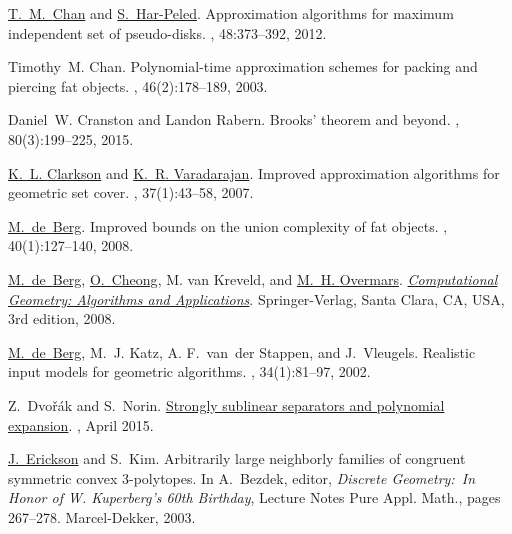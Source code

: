 \documentclass[12pt]{article}
\theoremstyle{remark}\theoremheaderfont{\sf}\theorembodyfont{\upshape}
\numberwithin{figure}{section}\numberwithin{table}{section}\numberwithin{equation}{section}
\begin{document}
{\begin{thebibliography}{vdSOdBV98}
\href{http://www.math.uwaterloo.ca/~tmchan/}{T.~M.~{Chan}} and \href{http://sarielhp.org}{S.~{{Har-Peled}}}.
\newblock  Approximation algorithms for maximum independent set of
  pseudo-disks.
, 48:373--392, 2012.

Timothy~M. Chan.
\newblock  Polynomial-time approximation schemes for packing and piercing fat
  objects.
, 46(2):178--189, 2003.

Daniel~W. Cranston and Landon Rabern.
\newblock  Brooks' theorem and beyond.
, 80(3):199--225, 2015.

\href{http://cm.bell-labs.com/who/clarkson/}{K.~L. {Clarkson}} and \href{http://www.cs.uiowa.edu/~kvaradar/}{K.~R. {Varadarajan}}.
\newblock  Improved approximation algorithms for geometric set cover.
, 37(1):43--58, 2007.

\href{http://www.win.tue.nl/~mdberg/}{M.~de~{Berg}}.
\newblock  Improved bounds on the union complexity of fat objects.
, 40(1):127--140, 2008.

\href{http://www.win.tue.nl/~mdberg/}{M.~de~{Berg}}, \href{http://www.win.tue.nl/~ocheong}{O.~{Cheong}}, {M. van} Kreveld, and \href{http://www.cs.uu.nl/people/markov/}{M.~H. {Overmars}}.
\newblock \href{http://www.cs.uu.nl/geobook/}{{\em Computational Geometry:
  Algorithms and Applications}}.
\newblock Springer-Verlag, Santa Clara, CA, USA, 3rd edition, 2008.

\href{http://www.win.tue.nl/~mdberg/}{M.~de~{Berg}}, M.~J. Katz, {A. F.}~{van~der} Stappen, and J.~Vleugels.
\newblock  Realistic input models for geometric algorithms.
, 34(1):81--97, 2002.

Z.~{Dvo{\v{r}}{\'{a}}k} and S.~{Norin}.
\newblock \href{http://arxiv.org/abs/1504.04821}{{Strongly sublinear separators
  and polynomial expansion}}.
, April 2015.

\href{http://compgeom.cs.uiuc.edu/~jeffe/}{J.~{Erickson}} and S.~Kim.
\newblock  Arbitrarily large neighborly families of congruent symmetric convex
  3-polytopes.
\newblock In A.~Bezdek, editor, {\em Discrete Geometry:~In Honor of W.
  Kuperberg's 60th Birthday}, Lecture Notes Pure Appl. Math., pages 267--278.
  Marcel-Dekker, 2003.


\end{thebibliography}}
\end{document}
